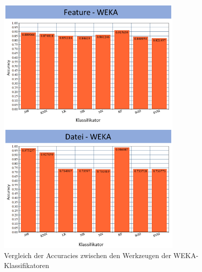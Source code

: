 \begin{figure}[]
    \centering
    \includegraphics[width=0.8\textwidth]{images/Final_weka}
    \caption{Vergleich der Accuracies zwischen den Werkzeugen der WEKA-Klassifikatoren\label{fig:final-weka}}
\end{figure}

